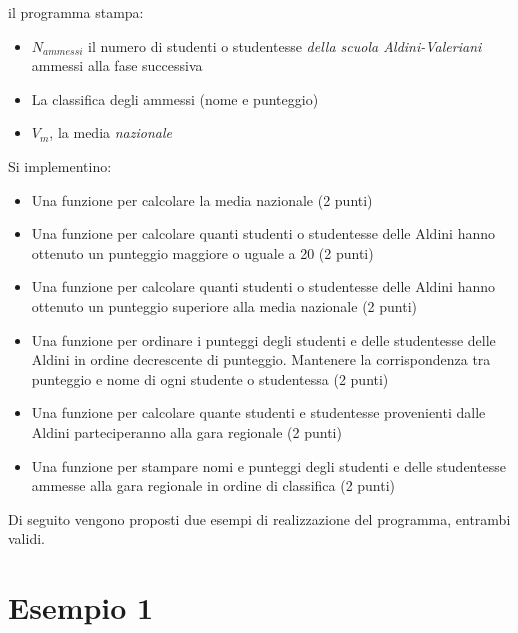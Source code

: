 \documentclass[a4paper, 11pt]{exam}
\begin{document}
il programma stampa:
\begin{itemize}
	\item $N_{ammessi}$ 	il numero di studenti o studentesse \emph{della scuola Aldini-Valeriani} ammessi alla fase successiva
	\item La classifica degli ammessi (nome e punteggio)
	\item $V_m$, la media \emph{nazionale}
\end{itemize}

Si implementino:

\begin{itemize}
	\item Una funzione per calcolare la media nazionale (2 punti)
	\item Una funzione per calcolare quanti studenti o studentesse delle Aldini hanno ottenuto un punteggio maggiore o uguale a 20 (2 punti)
	\item Una funzione per calcolare quanti studenti o studentesse delle Aldini hanno ottenuto un punteggio superiore alla media nazionale (2 punti)
	\item Una funzione per ordinare i punteggi degli studenti e delle studentesse delle Aldini in ordine decrescente di punteggio. Mantenere la corrispondenza tra punteggio e nome di ogni studente o studentessa (2 punti)
	\item Una funzione per calcolare quante studenti e studentesse provenienti dalle Aldini parteciperanno alla gara regionale (2 punti)
	\item Una funzione per stampare nomi e punteggi degli studenti e delle studentesse ammesse alla gara regionale in ordine di classifica (2 punti)
\end{itemize}

Di seguito vengono proposti due esempi di realizzazione del programma, entrambi validi. 

\section*{Esempio 1}
\end{document}
